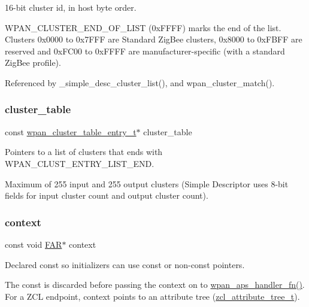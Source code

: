16-\/bit cluster id, in host byte order. 

W\+P\+A\+N\+\_\+\+C\+L\+U\+S\+T\+E\+R\+\_\+\+E\+N\+D\+\_\+\+O\+F\+\_\+\+L\+I\+ST (0x\+F\+F\+FF) marks the end of the list. Clusters 0x0000 to 0x7\+F\+FF are Standard Zig\+Bee clusters, 0x8000 to 0x\+F\+B\+FF are reserved and 0x\+F\+C00 to 0x\+F\+F\+FF are manufacturer-\/specific (with a standard Zig\+Bee profile). 

Referenced by \+\_\+simple\+\_\+desc\+\_\+cluster\+\_\+list(), and wpan\+\_\+cluster\+\_\+match().

\mbox{\label{group__wpan__aps_gac7944498524739a9becec626bf9bcb15}} 
\subsubsection{\texorpdfstring{cluster\+\_\+table}{cluster\_table}}
{\footnotesize\ttfamily const \hyperlink{structwpan__cluster__table__entry__t}{wpan\+\_\+cluster\+\_\+table\+\_\+entry\+\_\+t}$\ast$ cluster\+\_\+table}



Pointers to a list of clusters that ends with W\+P\+A\+N\+\_\+\+C\+L\+U\+S\+T\+\_\+\+E\+N\+T\+R\+Y\+\_\+\+L\+I\+S\+T\+\_\+\+E\+ND. 

Maximum of 255 input and 255 output clusters (Simple Descriptor uses 8-\/bit fields for input cluster count and output cluster count). \mbox{\label{group__wpan__aps_gad58378484a15ab673f5eb1613114330e}} 
\subsubsection{\texorpdfstring{context}{context}}
{\footnotesize\ttfamily const void \hyperlink{group__hal_gaef060b3456fdcc093a7210a762d5f2ed}{F\+AR}$\ast$ context}



Declared {\ttfamily const} so initializers can use {\ttfamily const} or non-\/{\ttfamily const} pointers. 

The {\ttfamily const} is discarded before passing the context on to \hyperlink{group__wpan__aps_ga8575b0db762a5fbb858d4994c9b657e3}{wpan\+\_\+aps\+\_\+handler\+\_\+fn()}. For a Z\+CL endpoint, {\ttfamily context} points to an attribute tree (\hyperlink{structzcl__attribute__tree__t}{zcl\+\_\+attribute\+\_\+tree\+\_\+t}). \mbox{\label{group__wpan__aps_gad7c834ea25a2f008caaf40ec08aa5a86}} 
